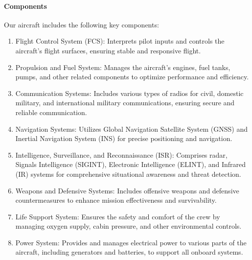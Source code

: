 \documentclass[a4paper,11pt]{article}
\begin{document}
	\paragraph{Components}
	Our aircraft includes the following key components:
	\begin{enumerate}[label=P\arabic*)]
		\item Flight Control System (FCS): Interprets pilot inputs and controls the aircraft's flight surfaces, ensuring stable and responsive flight.
		\item Propulsion and Fuel System: Manages the aircraft's engines, fuel tanks, pumps, and other related components to optimize performance and efficiency.
		\item Communication Systems: Includes various types of radios for civil, domestic military, and international military communications, ensuring secure and reliable communication.
		\item Navigation Systems: Utilizes Global Navigation Satellite System (GNSS) and Inertial Navigation System (INS) for precise positioning and navigation.
		\item Intelligence, Surveillance, and Reconnaissance (ISR): Comprises radar, Signals Intelligence (SIGINT), Electronic Intelligence (ELINT), and Infrared (IR) systems for comprehensive situational awareness and threat detection.
		\item Weapons and Defensive Systems: Includes offensive weapons and defensive countermeasures to enhance mission effectiveness and survivability.
		\item Life Support System: Ensures the safety and comfort of the crew by managing oxygen supply, cabin pressure, and other environmental controls.
		\item Power System: Provides and manages electrical power to various parts of the aircraft, including generators and batteries, to support all onboard systems.
	\end{enumerate}
\end{document}
